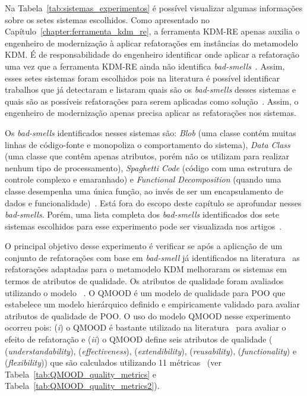 Na Tabela~\ref{tab:sistemas_experimentos} é possível visualizar algumas informações sobre os setes sistemas escolhidos. Como apresentado no Capítulo~\ref{chapter:ferramenta_kdm_re}, a ferramenta KDM-RE apenas auxilia o engenheiro de modernização à aplicar refatorações em instâncias do metamodelo KDM. É de responsabilidade do engenheiro identificar onde aplicar a refatoração uma vez que a ferramenta KDM-RE ainda não identifica \textit{bad-smells}~\cite{Fowler1999}. Assim, esses setes sistemas foram escolhidos pois na literatura é possível identificar trabalhos que já detectaram e listaram quais são os \textit{bad-smells} desses sistemas e quais são as possíveis refatorações para serem aplicadas como solução~\cite{Kessentini_2011, Ouni_2013, Moha_2010, Kessentini_2010}. Assim, o engenheiro de modernização apenas precisa aplicar as refatorações nos sistemas.  




Os \textit{bad-smells} identificados nesses sistemas são: \textit{Blob} (uma classe contém muitas linhas de código-fonte e monopoliza o comportamento do sistema), \textit{Data Class} (uma classe que contêm apenas atributos, porém não os utilizam para realizar nenhum tipo de processamento), \textit{Spaghetti Code} (código com uma estrutura de controle complexo e emaranhado) e \textit{Functional Decomposition} (quando uma classe desempenha uma única função, ao invés de ser um encapsulamento de dados e funcionalidade)~\cite{Fowler1999}. Está fora do escopo deste capítulo se aprofundar nesses \textit{bad-smells}. Porém, uma lista completa dos \textit{bad-smells} identificados dos sete sistemas escolhidos para esse experimento pode ser visualizada nos artigos~\cite{Kessentini_2011, Ouni_2013, Moha_2010, Kessentini_2010}.

O principal objetivo desse experimento é verificar se após a aplicação de um conjunto de refatorações com base em \textit{bad-smell} já identificados na literatura~\cite{Kessentini_2011, Ouni_2013, Moha_2010, Kessentini_2010} as refatorações adaptadas para o metamodelo KDM melhoraram os sistemas em termos de atributos de qualidade. Os atributos de qualidade foram avaliados utilizando o modelo ~\cite{Bansiya_QMOOD}. O QMOOD é um modelo de qualidade para POO que estabelece um modelo hierárquico definido e empiricamente validado para avaliar atributos de qualidade de POO. O uso do modelo QMOOD nesse experimento ocorreu pois: (\textit{i}) o QMOOD é bastante utilizado na literatura~\cite{Keeffe_2008, Seng_2006, Jensen_2010} para avaliar o efeito de refatoração e (\textit{ii}) o QMOOD define seis atributos de qualidade ( (\textit{understandability}),  (\textit{effectiveness}),  (\textit{extendibility}),  (\textit{reusability}),  (\textit{functionality}) e  (\textit{flexibility})) que são calculados utilizando 11 métricas~\cite{Bansiya_QMOOD} (ver Tabela~\ref{tab:QMOOD_quality_metrics} e Tabela~\ref{tab:QMOOD_quality_metrics2}). 


